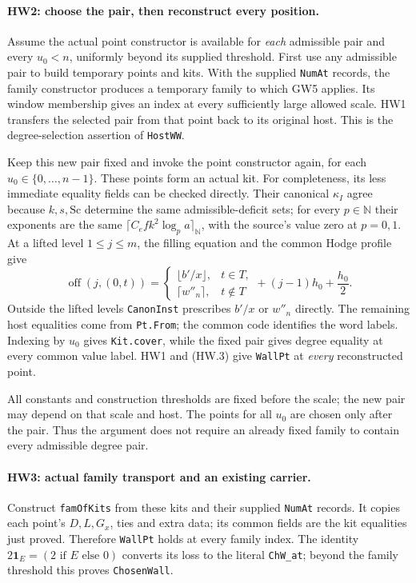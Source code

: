 \paragraph{HW2: choose the pair, then reconstruct every position.}
Assume the actual point constructor is available for \emph{each}
admissible pair and every $u_0<n$, uniformly beyond its supplied
threshold. First use any admissible pair to build temporary points and
kits. With the supplied \texttt{NumAt} records, the family constructor
produces a temporary family to which GW5 applies. Its window membership
gives an index at every sufficiently large allowed scale. HW1 transfers
the selected pair from that point back to its original host. This is the
degree-selection assertion of \texttt{HostWW}.

Keep this new pair fixed and invoke the point constructor again, for
each $u_0\in\{0,\ldots,n-1\}$. These points form an actual kit.
For completeness, its less immediate equality fields can be checked
directly. Their canonical $\kappa_I$ agree because $k,s,\mathrm{Sc}$
determine the same admissible-deficit sets; for every $p\in\mathbb N$
their exponents are the same
$\lceil C_e f k^2\log_p a\rceil_{\mathbb N}$, with the source's
value zero at $p=0,1$. At a lifted level $1\le j\le m$,
the filling equation and the common Hodge profile give
\[
 \operatorname{off}(j,(0,t))=
 \begin{cases}\lfloor b'/x\rfloor,&t\in T,\\
               \lceil w''_n\rceil,&t\notin T
 \end{cases}
 +(j-1)h_0+\frac{h_0}{2}.                         \tag{HW.4}
\]
Outside the lifted levels \texttt{CanonInst} prescribes $b'/x$ or
$w''_n$ directly. The remaining host equalities come from
\texttt{Pt.From}; the common code identifies the word labels. Indexing
by $u_0$ gives \texttt{Kit.cover}, while the fixed pair gives degree
equality at every common value label. HW1 and (HW.3) give
\texttt{WallPt} at \emph{every} reconstructed point.

All constants and construction thresholds are fixed before the scale;
the new pair may depend on that scale and host. The points for all
$u_0$ are chosen only after the pair. Thus the argument does not require
an already fixed family to contain every admissible degree pair.

\paragraph{HW3: actual family transport and an existing carrier.}
Construct \texttt{famOfKits} from these kits and their supplied
\texttt{NumAt} records. It copies each point's $D,L,G_x$, ties and extra
data; its common fields are the kit equalities just proved. Therefore
\texttt{WallPt} holds at every family index. The identity
$2\mathbf1_E=(2\text{ if }E\text{ else }0)$ converts its loss to the
literal \texttt{ChW\_at}; beyond the family threshold this proves
\texttt{ChosenWall}.

